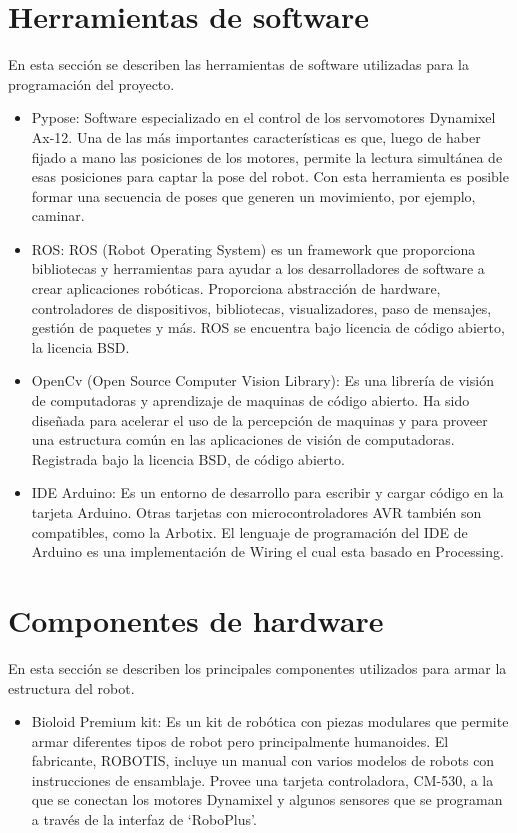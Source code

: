 \section{ Herramientas de software}
En esta sección se describen las herramientas de software utilizadas para la programación del proyecto.
\begin{itemize}
\item Pypose: Software especializado en el control de los servomotores Dynamixel Ax-12. Una de las más importantes características es que, luego de haber fijado a mano las posiciones de los motores, permite la lectura simultánea de esas posiciones para captar la pose del robot. Con esta herramienta es posible formar una secuencia de poses que generen un movimiento, por ejemplo, caminar. \cite{pypose}

\item ROS: ROS (Robot Operating System) es un framework que proporciona bibliotecas y herramientas para ayudar a los desarrolladores de software a crear aplicaciones robóticas. Proporciona abstracción de hardware, controladores de dispositivos, bibliotecas, visualizadores, paso de mensajes, gestión de paquetes y más. ROS se encuentra bajo licencia de código abierto, la licencia BSD.

\item OpenCv (Open Source Computer Vision Library): Es una librería de visión de computadoras y aprendizaje de maquinas de código abierto. Ha sido diseñada para acelerar el uso de la percepción de maquinas y para proveer una estructura común en las aplicaciones de visión de computadoras. Registrada bajo la licencia BSD, de código abierto. \cite{opencv}

\item IDE Arduino: Es un entorno de desarrollo para escribir y cargar código en la tarjeta Arduino. Otras tarjetas con microcontroladores AVR también son compatibles, como la Arbotix. El lenguaje de programación del IDE de Arduino es una implementación de Wiring el cual esta basado en Processing.  \cite{arduino}

\end{itemize}


\section{Componentes de hardware}
En esta sección se describen los principales componentes utilizados para armar la estructura del robot.
\begin{itemize}
\item Bioloid Premium kit: Es un kit de robótica con piezas modulares que permite armar diferentes tipos de robot pero principalmente humanoides. El fabricante, ROBOTIS, incluye un manual con varios modelos de robots con instrucciones de ensamblaje. Provee una tarjeta controladora, CM-530, a la que se conectan los motores Dynamixel y algunos sensores que se programan a través de la interfaz de ‘RoboPlus’.

\end{itemize}

